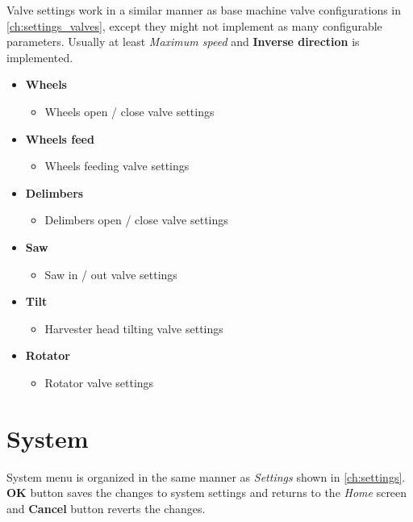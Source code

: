 \documentclass[12pt,a4paper,english]{uvmanual}
\begin{document}
Valve settings work in a similar manner as base machine valve configurations in \autoref{ch:settings_valves}, except they might not implement as many configurable parameters. Usually at least \textit{Maximum speed} and \textbf{Inverse direction} is implemented.


\begin{itemize}
 \item \textbf{Wheels}
 \begin{itemize}
  \item Wheels open / close valve settings
 \end{itemize}

 \item \textbf{Wheels feed}
 \begin{itemize}
  \item Wheels feeding valve settings
 \end{itemize}

 \item \textbf{Delimbers}
 \begin{itemize}
  \item Delimbers open / close valve settings
 \end{itemize}

 \item \textbf{Saw}
 \begin{itemize}
  \item Saw in / out valve settings
 \end{itemize}

 \item \textbf{Tilt}
 \begin{itemize}
  \item Harvester head tilting valve settings
 \end{itemize}
 
\item \textbf{Rotator}
\begin{itemize}
 \item Rotator valve settings
\end{itemize}

\end{itemize}


\chapter{System}\label{ch:system}

System menu is organized in the same manner as \textit{Settings} shown in \autoref{ch:settings}. \textbf{OK} button saves the changes to system settings and returns to the \textit{Home} screen and \textbf{Cancel} button reverts the changes.
\end{document}
